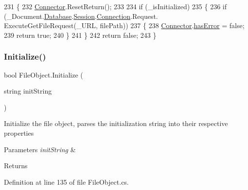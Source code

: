 \begin{DoxyCode}
231     \{
232         \mbox{\hyperlink{class_connector}{Connector}}.ResetReturn();
233 
234         \textcolor{keywordflow}{if} (\_isInitialized)
235         \{
236             \textcolor{keywordflow}{if} (\_Document.\mbox{\hyperlink{class_document_object_a69d5338c9835f748490323d2950eed09}{Database}}.\mbox{\hyperlink{class_database_object_aa8484162b7d2a7c4c9426bca13c64c07}{Session}}.\mbox{\hyperlink{class_session_object_a014bdbf705a753540e19bfb53030c55c}{Connection}}.Request.
      ExecuteGetFileRequest(\_URL, filePath))
237             \{
238                 \mbox{\hyperlink{class_connector}{Connector}}.\mbox{\hyperlink{class_connector_a079bae21a5417efa53bfe8954c0f533f}{hasError}} = \textcolor{keyword}{false};
239                 \textcolor{keywordflow}{return} \textcolor{keyword}{true};
240             \}
241         \}
242         \textcolor{keywordflow}{return} \textcolor{keyword}{false};
243     \}
\end{DoxyCode}
\mbox{\label{class_file_object_a1d371eb0e306cda4b80d2e8d32e987e0}} 
\subsubsection{\texorpdfstring{Initialize()}{Initialize()}}
{\footnotesize\ttfamily bool File\+Object.\+Initialize (\begin{DoxyParamCaption}\item[{string}]{init\+String }\end{DoxyParamCaption})}



Initialize the file object, parses the initialization string into their respective properties 


\begin{DoxyParams}{Parameters}
{\em init\+String} & \\
\hline
\end{DoxyParams}
\begin{DoxyReturn}{Returns}

\end{DoxyReturn}


Definition at line 135 of file File\+Object.\+cs.


